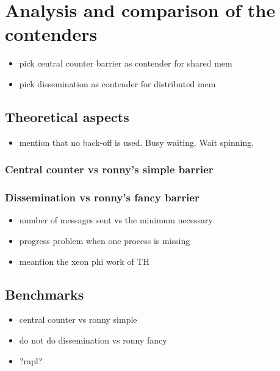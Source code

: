 \documentclass[a4paper, 10pt]{article}
\begin{document}
\section{Analysis and comparison of the contenders}

\begin{itemize}
	\item pick central counter barrier as contender for shared mem
	\item pick dissemination as contender for distributed mem
\end{itemize}

\subsection{Theoretical aspects}
\begin{itemize}
	\item mention that no back-off is used. Busy waiting. Wait spinning.
\end{itemize}

\subsubsection{Central counter vs ronny's simple barrier}
\subsubsection{Dissemination vs ronny's fancy barrier}
\begin{itemize}
	\item number of messages sent vs the minimum necessary
	\item progress problem when one process is missing
	\item meantion the xeon phi work of TH
\end{itemize}

\subsection{Benchmarks}
\begin{itemize}
	\item central counter vs ronny simple
	\item do not do dissemination vs ronny fancy
	\item ?rapl?
\end{itemize}
\end{document}
